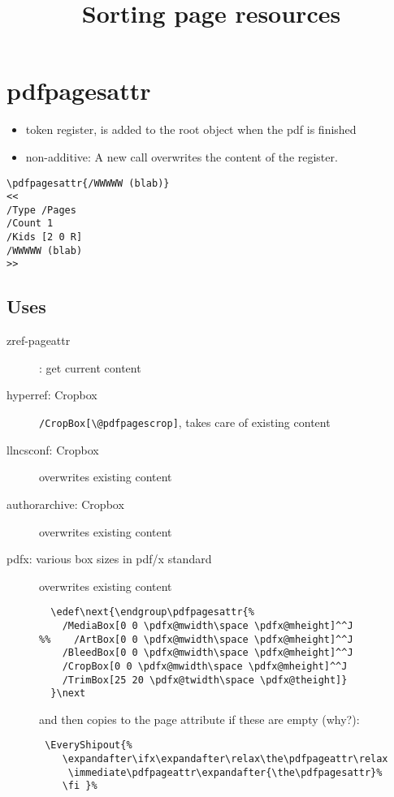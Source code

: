\documentclass{article}
\begin{document}
\title{Sorting page resources}
\maketitle

\section{pdfpagesattr}
\begin{itemize}
\item token register, is added to the root object when the pdf is finished

\item non-additive: A new call overwrites the content of the register.
\end{itemize}

\begin{verbatim}
\pdfpagesattr{/WWWWW (blab)}
<<
/Type /Pages
/Count 1
/Kids [2 0 R]
/WWWWW (blab)
>>
\end{verbatim}

\subsection{Uses}
\begin{description}
\item[zref-pageattr]: get current content
\item[hyperref: Cropbox] \verb+/CropBox[\@pdfpagescrop]+, takes care of existing content
\item[llncsconf: Cropbox]    overwrites existing content
\item[authorarchive: Cropbox] overwrites existing content
\item[pdfx: various box sizes in pdf/x standard]  overwrites existing content
\begin{verbatim}
  \edef\next{\endgroup\pdfpagesattr{%
    /MediaBox[0 0 \pdfx@mwidth\space \pdfx@mheight]^^J
%%    /ArtBox[0 0 \pdfx@mwidth\space \pdfx@mheight]^^J
    /BleedBox[0 0 \pdfx@mwidth\space \pdfx@mheight]^^J
    /CropBox[0 0 \pdfx@mwidth\space \pdfx@mheight]^^J
    /TrimBox[25 20 \pdfx@twidth\space \pdfx@theight]}
  }\next
\end{verbatim}
and then copies to the page attribute if these are empty (why?):
\begin{verbatim}
 \EveryShipout{%
    \expandafter\ifx\expandafter\relax\the\pdfpageattr\relax
     \immediate\pdfpageattr\expandafter{\the\pdfpagesattr}%
    \fi }%
\end{verbatim}
\end{description}
\end{document}
